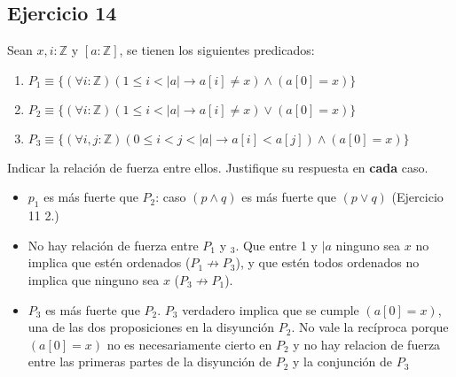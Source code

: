 \documentclass[10pt,a4paper]{article}
\begin{document}
\subsection*{Ejercicio 14}
Sean $x, i : \mathbb{Z}$ y $[a : \mathbb{Z}]$, se tienen los siguientes predicados:
\begin{enumerate}
\item $P_{1} \equiv \{(\forall i : \mathbb{Z}) (1 \leq i < |a| \rightarrow a[i] \not = x) \wedge (a[0] = x)\}$
\item $P_{2} \equiv \{(\forall i : \mathbb{Z}) (1 \leq i < |a| \rightarrow a[i] \not = x) \vee (a[0] = x)\}$
\item $P_{3} \equiv \{(\forall i, j : \mathbb{Z}) (0 \leq i < j < |a| \rightarrow a[i] < a[j]) \wedge (a[0] = x)\}$
\end{enumerate}
Indicar la relación de fuerza entre ellos. Justifique su respuesta en \textbf{cada} caso.
\begin{itemize}
\item $p_{1}$ es más fuerte que $P_{2}$: caso $(p \wedge q)$ es más fuerte que $(p \vee q)$ (Ejercicio 11 2.)
\item No hay relación de fuerza entre $P_{1}$ y $_{3}$. Que entre 1 y $|a$ ninguno sea $x$ no implica que estén ordenados ($P_{1}\not \rightarrow P_{3}$), y que estén todos ordenados no implica que ninguno sea $x$ ($P_{3}\not \rightarrow P_{1}$).
\item $P_{3}$ es más fuerte que $P_{2}$. $P_{3}$ verdadero implica que se cumple $(a[0] = x)$, una de las dos proposiciones en la disyunción $P_{2}$. No vale la recíproca porque $(a[0] = x)$ no es necesariamente cierto en $P_{2}$ y no hay relacion de fuerza entre las primeras partes de la disyunción de $P_{2}$ y la conjunción de $P_{3}$
\end{itemize}
\end{document}

